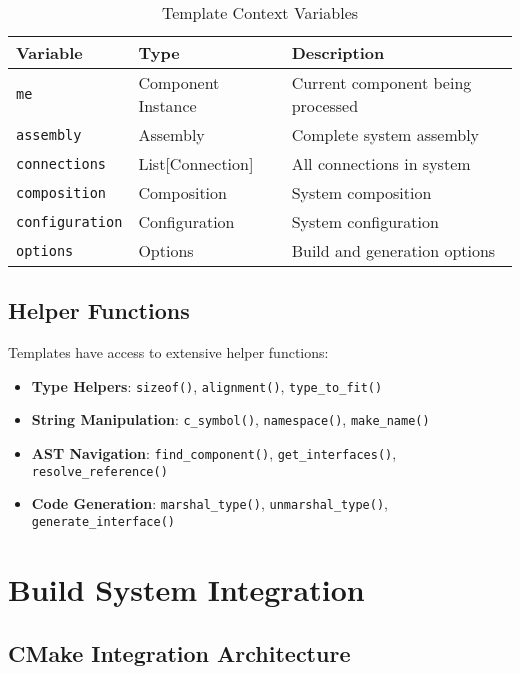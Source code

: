 \documentclass[12pt,a4paper]{article}
\begin{document}
\begin{table}[h!]
\centering
\begin{tabular}{@{}lll@{}}
\toprule
\textbf{Variable} & \textbf{Type} & \textbf{Description} \\
\midrule
\texttt{me} & Component Instance & Current component being processed \\
\texttt{assembly} & Assembly & Complete system assembly \\
\texttt{connections} & List[Connection] & All connections in system \\
\texttt{composition} & Composition & System composition \\
\texttt{configuration} & Configuration & System configuration \\
\texttt{options} & Options & Build and generation options \\
\bottomrule
\end{tabular}
\caption{Template Context Variables}
\end{table}

\subsection{Helper Functions}
Templates have access to extensive helper functions:

\begin{itemize}
    \item \textbf{Type Helpers}: \texttt{sizeof()}, \texttt{alignment()}, \texttt{type\_to\_fit()}
    \item \textbf{String Manipulation}: \texttt{c\_symbol()}, \texttt{namespace()}, \texttt{make\_name()}
    \item \textbf{AST Navigation}: \texttt{find\_component()}, \texttt{get\_interfaces()}, \texttt{resolve\_reference()}
    \item \textbf{Code Generation}: \texttt{marshal\_type()}, \texttt{unmarshal\_type()}, \texttt{generate\_interface()}
\end{itemize}

\section{Build System Integration}

\subsection{CMake Integration Architecture}
\end{document}
